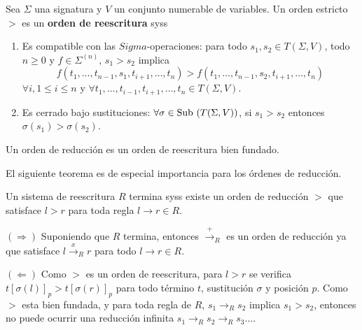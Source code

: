 \begin{defi}
  Sea $\Sigma$ una signatura y $V$ un conjunto numerable de
  variables. Un orden estricto $>$ es un \textbf{orden de reescritura} syss
  \begin{enumerate}
  \item Es compatible con las $Sigma$-operaciones: para todo
    $s_1,s_2 \in T(\Sigma, V)$, todo $n \geq 0$ y
    $f \in \Sigma^{(n)}$, $s_1 > s_2$ implica
    \[ f(t_1, \dots, t_{n-1}, s_1, t_{i+1}, \dots, t_n) > f(t_1,
      \dots, t_{n-1}, s_2, t_{i+1}, \dots, t_n) \]
    $\forall i, 1 \leq i \leq n$ y
    $\forall t_1, \dots, t_{i-1}, t_{i+1}, \dots, t_n \in T(\Sigma,
    V)$. %
  \item Es cerrado bajo sustituciones:
    $\forall \sigma \in \mbox{Sub }(T(\Sigma,V))$, si $s_1 > s_2$ entonces
    $\sigma(s_1) > \sigma(s_2)$.
  \end{enumerate}
  Un orden de reducción es un orden de reescritura bien fundado.
\end{defi}


El siguiente teorema es de especial importancia para los órdenes de
reducción.

\begin{teor} 
  Un sistema de reescritura $R$ termina syss existe un orden de
  reducción $>$ que satisface $l>r$ para toda regla
  $l \rightarrow r \in R$.
\end{teor}

\begin{demo}
  $(\Rightarrow)$ Suponiendo que $R$ termina, entonces
  $\xrightarrow{+}_R$ es un orden de reducción ya que satisface
  $l \xrightarrow{x}_R r$ para todo $l \rightarrow r \in R$.

  $(\Leftarrow)$ Como $>$ es un orden de reescritura, para $l > r$ se
  verifica $t [ \sigma(l) ]_p > t [ \sigma(r) ]_p$ para todo
  término $t$, sustitución $\sigma$ y posición $p$. Como $>$ esta bien
  fundada, y para toda regla de $R$, $s_1 \rightarrow_R s_2$ implica
  $s_1 > s_2$, entonces no puede ocurrir una reducción infinita
  $s_1 \rightarrow_R s_2 \rightarrow_R s_3 \dots$.
\end{demo}



